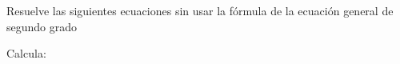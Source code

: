 \documentclass[addpoints,spanish, 12pt,a4paper]{exam}
\begin{document}
\begin{questions}



\question[1] Resuelve las siguientes ecuaciones sin usar la fórmula de la ecuación general de segundo grado
\question Calcula: 
\begin{parts}

\end{parts}
\end{questions}
\end{document}

